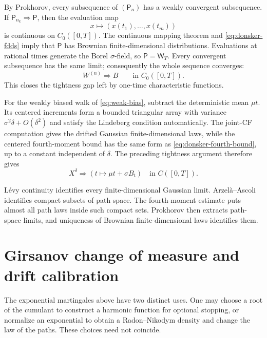 \documentclass[10pt,a4paper]{article}
\numberwithin{equation}{section}
\theoremstyle{blueplain}
\theoremstyle{definition}
\begin{document}
By Prokhorov, every subsequence of \((\mathsf P_n)\) has a weakly convergent
subsequence.  If \(\mathsf P_{n_k}\Rightarrow\mathsf P\), then the evaluation
map
\[
  x\longmapsto(x(t_1),\ldots,x(t_m))
\]
is continuous on \(C_0([0,T])\).  The continuous mapping theorem and
\eqref{eq:donsker-fdds} imply that \(\mathsf P\) has Brownian
finite-dimensional distributions.  Evaluations at rational times generate
the Borel \(\sigma\)-field, so \(\mathsf P=\mathsf W_T\).  Every convergent
subsequence has the same limit; consequently the whole sequence converges:
\begin{equation}
  W^{(n)}\Rightarrow B
  \qquad\text{in }C_0([0,T]).
  \label{eq:donsker-complete}
\end{equation}
This closes the tightness gap left by one-time characteristic functions.

For the weakly biased walk of \eqref{eq:weak-bias}, subtract the deterministic
mean \(\mu t\).  Its centered increments form a bounded triangular array with
variance \(\sigma^2\delta+O(\delta^2)\) and satisfy the Lindeberg condition
automatically.  The joint-CF computation gives the drifted Gaussian
finite-dimensional laws, while the centered fourth-moment bound has the same
form as \eqref{eq:donsker-fourth-bound}, up to a constant independent of
\(\delta\).  The preceding tightness argument therefore gives
\begin{equation}
  X^\delta\Rightarrow(t\mapsto\mu t+\sigma B_t)
  \quad\text{in }C([0,T]).
  \label{eq:drifted-functional-clt}
\end{equation}

\begin{keybox}
L\'evy continuity identifies every finite-dimensional Gaussian limit.
Arzel\`a--Ascoli identifies compact subsets of path space.  The fourth-moment
estimate puts almost all path laws inside such compact sets.  Prokhorov then
extracts path-space limits, and uniqueness of Brownian finite-dimensional laws
identifies them.
\end{keybox}

\clearpage
\section{Girsanov change of measure and drift calibration}
\label{sec:girsanov}

The exponential martingales above have two distinct uses.  One may choose a
root of the cumulant to construct a harmonic function for optional stopping,
or normalize an exponential to obtain a Radon--Nikodym density and change the
law of the paths.  These choices need not coincide.
\end{document}
